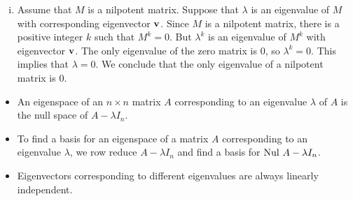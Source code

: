 \begin{example}
\begin{enumerate}[i.]
	\item Assume that $M$ is a nilpotent matrix. Suppose that $\lambda$ is an eigenvalue of $M$ with corresponding eigenvector $\mathbf{v}$. Since $M$ is a nilpotent matrix, there is a positive integer $k$ such that $M^k = 0$. But $\lambda^k$ is an eigenvalue of $M^k$ with eigenvector $\mathbf{v}$. The only eigenvalue of the zero matrix is $0$, so $\lambda^k = 0$. This implies that $\lambda = 0$. We conclude that the only eigenvalue of a nilpotent matrix is $0$. 
	
	\end{enumerate}

\ea
\end{example}


\label{sec:egspace_summ}
\begin{itemize}
\item An eigenspace of an $n \times n$ matrix $A$ corresponding to an eigenvalue $\lambda$ of $A$ is the null space of $A - \lambda I_n$. 
\item To find a basis for an eigenspace of a matrix $A$ corresponding to an eigenvalue $\lambda$, we row reduce $A - \lambda I_n$ and find a basis for $\text{Nul } A - \lambda I_n$. 
\item Eigenvectors corresponding to different eigenvalues are always linearly independent. 
\end{itemize}



